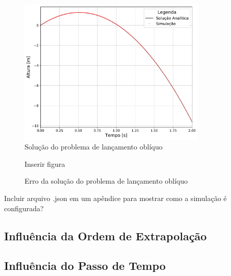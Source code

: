 \begin{figure}[h]
	\caption{Solução do problema de lançamento oblíquo}
	\begin{center}
		\includegraphics[width=0.8\textwidth]{images/falling_sphere/y_position.pdf}
	\end{center}
	\label{fig:falling_sphere}
\end{figure}

\begin{figure}[h]
	\caption{Erro da solução do problema de lançamento oblíquo}
	\begin{center}
		\alert{Inserir figura}
	\end{center}
	\label{fig:falling_sphere_error}
\end{figure}

\alert{Incluir arquivo .json em um apêndice para mostrar como a simulação é configurada?}

\subsection{Influência da Ordem de Extrapolação}

\subsection{Influência do Passo de Tempo}

